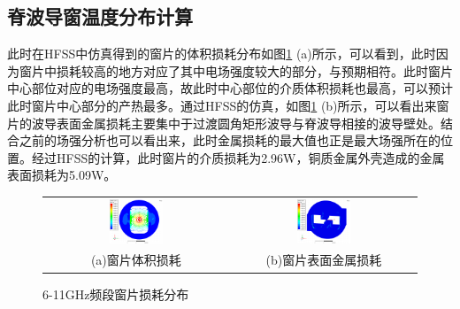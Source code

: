 \documentclass[master]{thesis-uestc}
\begin{document}
\subsection{脊波导窗温度分布计算}
此时在HFSS中仿真得到的窗片的体积损耗分布如图\ref{fig:X频段窗损耗分布图} (a)所示，可以看到，此时因为窗片中损耗较高的地方对应了其中电场强度较大的部分，与预期相符。此时窗片中心部位对应的电场强度最高，故此时中心部位的介质体积损耗也最高，可以预计此时窗片中心部分的产热最多。通过HFSS的仿真，如图\ref{fig:X频段窗损耗分布图} (b)所示，可以看出来窗片的波导表面金属损耗主要集中于过渡圆角矩形波导与脊波导相接的波导壁处。结合之前的场强分析也可以看出来，此时金属损耗的最大值也正是最大场强所在的位置。经过HFSS的计算，此时窗片的介质损耗为2.96W，铜质金属外壳造成的金属表面损耗为5.09W。
\begin{figure}[!htb]
    \small
    \centering
    \begin{tabular}{@{\ }c@{\ }c}
        \includegraphics[width=0.3\textwidth]{pic/chapter3/X频段窗片体积损耗.png} & 
        \hspace{5pt}
        \includegraphics[width=0.3\textwidth]{pic/chapter3/X频段波导表面损耗.png}     \\
        \mbox{\small (a)窗片体积损耗}                                                                               & 
        \mbox{\small (b)窗片表面金属损耗}                                                                                  \\
    \end{tabular}
    \caption{6-11GHz频段窗片损耗分布}
    \label{fig:X频段窗损耗分布图}
\end{figure}
\end{document}
